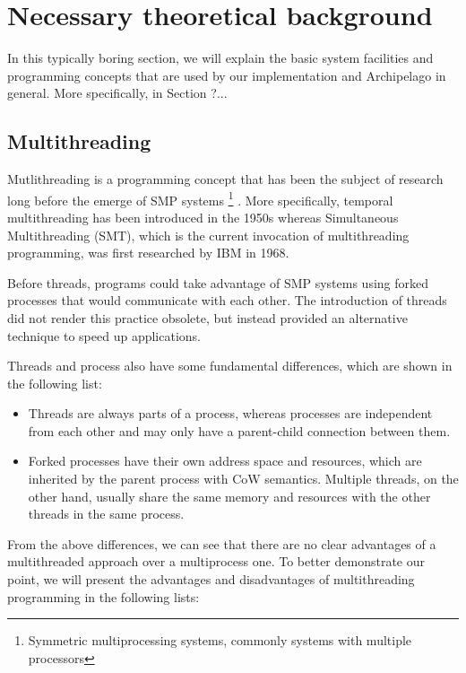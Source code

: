 \chapter{Necessary theoretical background}\label{ch:theory}

In this typically boring section, we will explain the basic system facilities 
and programming concepts that are used by our implementation and Archipelago in 
general. More specifically, in Section ?...

\section{Multithreading}

Mutlithreading is a programming concept that has been the subject of research 
long before the emerge of SMP systems
\footnote{Symmetric multiprocessing systems, commonly systems with multiple 
	processors}
. More specifically, temporal multithreading has been introduced in the 1950s 
whereas Simultaneous Multithreading (SMT), which is the current invocation of 
multithreading programming, was first researched by IBM in 1968\cite{mt}.

Before threads, programs could take advantage of SMP systems using forked 
processes that would communicate with each other. The introduction of threads 
did not render this practice obsolete, but instead provided an alternative 
technique to speed up applications.

Threads and process also have some fundamental differences, which are shown in 
the following list:

\begin{itemize}
	\item Threads are always parts of a process, whereas processes are 
		independent from each other and may only have a parent-child connection 
		between them.
	\item Forked processes have their own address space and resources, which 
		are inherited by the parent process with CoW semantics.  Multiple 
		threads, on the other hand, usually share the same memory and resources 
		with the other threads in the same process.
\end{itemize}

From the above differences, we can see that there are no clear advantages of a 
multithreaded approach over a multiprocess one. To better demonstrate our 
point, we will present the advantages and disadvantages of multithreading 
programming in the following lists:

